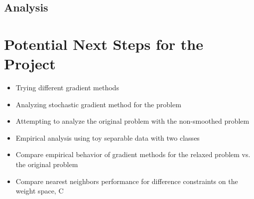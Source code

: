 \documentclass[11pt]{article}
\begin{document}
\subsection{Analysis}

\section{Potential Next Steps for the Project}

\begin{itemize}
  \item Trying different gradient methods
  \item Analyzing stochastic gradient method for the problem
  \item Attempting to analyze the original problem with the non-smoothed problem
  \item Empirical analysis using toy separable data with two classes
  \item Compare empirical behavior of gradient methods for the relaxed problem vs. the original problem
  \item Compare nearest neighbors performance for difference constraints on the weight space, C
\end{itemize}

\printbibliography
\end{document}
